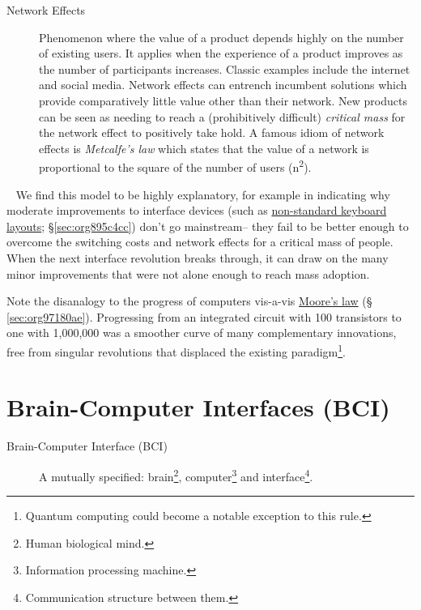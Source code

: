 \documentclass[logo,bsc,singlespacing,parskip]{infthesis}
\begin{document}
\begin{mdframed}
\begin{description}
\item[{Network Effects\label{network effects}}] Phenomenon where the value of a product depends highly on the number of existing users.
It applies when the experience of a product improves as the number of participants increases.
Classic examples include the internet and social media.
Network effects can entrench incumbent solutions which provide comparatively little value other than their network.
New products can be seen as needing to reach a (prohibitively difficult) \emph{critical mass} for the network effect to positively take hold.
A famous idiom of network effects is \emph{Metcalfe's law} which states that the value of a network is proportional to the square of the number of users (n\textsuperscript{2}).
\end{description}
\end{mdframed}
~
We find this model to be highly explanatory, for example in indicating why moderate improvements to interface devices (such as \hyperref[sec:org895c4cc]{non-standard keyboard layouts}; \S \ref{sec:org895c4cc}) don't go mainstream-- they  fail to be better enough to overcome the switching costs and network effects for a critical mass of people.
When the next interface revolution breaks through, it can draw on the many minor improvements that were not alone enough to reach mass adoption.

Note the disanalogy to the progress of computers vis-a-vis \hyperref[sec:org97180ae]{Moore's law} (§ \ref{sec:org97180ae}).
Progressing from an integrated circuit with 100 transistors to one with 1,000,000 was a smoother curve of many complementary innovations, free from singular revolutions that displaced the existing paradigm\footnote{Quantum computing could become a notable exception to this rule.}.

\chapter{Brain-Computer Interfaces (BCI)}
\label{sec:org9ee01b8}
\begin{mdframed}
\begin{description}
\item[{\label{org75a7ab5}Brain-Computer Interface (BCI)}] A mutually specified: brain\footnote{Human biological mind.}, computer\footnote{Information processing machine.} and interface\footnote{Communication structure between them.}.
\end{description}
\end{mdframed}
\end{document}
